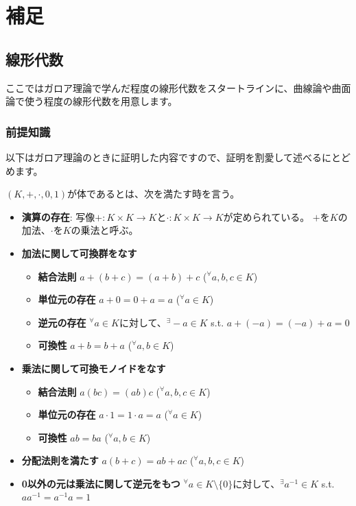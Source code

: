 \chapter{補足}

\section{線形代数}

ここではガロア理論で学んだ程度の線形代数をスタートラインに、曲線論や曲面論で使う程度の線形代数を用意します。

\subsection{前提知識}

以下はガロア理論のときに証明した内容ですので、証明を割愛して述べるにとどめます。
\begin{definition}[体]
  $(K,+,\cdot,0,1)$が体であるとは、次を満たす時を言う。
  \begin{itemize}
    \item \textbf{演算の存在}: 写像$+:K\times K\to K$と$\cdot:K\times K\to K$が定められている。
      $+$を$K$の加法、$\cdot$を$K$の乗法と呼ぶ。
    \item \textbf{加法に関して可換群をなす}
    \begin{itemize}
      \item \textbf{結合法則} $a+(b+c)=(a+b)+c$ (${}^\forall a,b,c\in K$)
      \item \textbf{単位元の存在} $a+0=0+a=a$ (${}^\forall a\in K$)
      \item \textbf{逆元の存在} ${}^\forall a\in K$に対して、${}^\exists -a\in K$ s.t. $a+(-a)=(-a)+a=0$
      \item \textbf{可換性} $a+b=b+a$ (${}^\forall a,b\in K$)
    \end{itemize}
    \item \textbf{乗法に関して可換モノイドをなす}
    \begin{itemize}
      \item \textbf{結合法則} $a(bc)=(ab)c$ (${}^\forall a,b,c\in K$)
      \item \textbf{単位元の存在} $a\cdot1=1\cdot a=a$ (${}^\forall a\in K$)
      \item \textbf{可換性} $ab=ba$ (${}^\forall a,b\in K$)
    \end{itemize}
    \item \textbf{分配法則を満たす} $a(b+c)=ab+ac$ (${}^\forall a,b,c\in K$)
    \item \textbf{0以外の元は乗法に関して逆元をもつ} ${}^\forall a\in K\setminus\{0\}$に対して、${}^\exists a^{-1}\in K$ s.t. $aa^{-1}=a^{-1}a=1$
  \end{itemize}
\end{definition}
